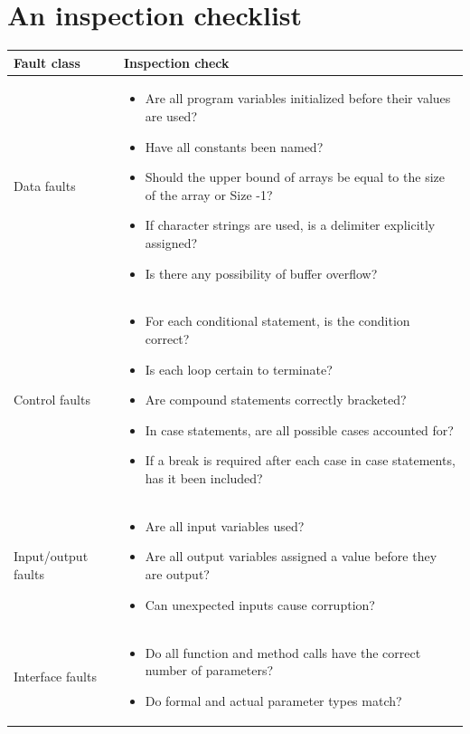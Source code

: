 \section {An inspection checklist}

\begin{longtable}{|p{2cm}|p{8cm}|}
\hline
Fault class & Inspection check\\
\hline
\hline
Data faults &
\begin{itemize}
  	\item Are all program variables initialized before their values are used?
    \item Have all constants been named?
  	\item Should the upper bound of arrays be equal to the size of the array or Size -1?
  	\item If character strings are used, is a delimiter explicitly assigned?
    \item Is there any possibility of buffer overflow?
\end{itemize}\\
\hline
Control faults &
\begin{itemize}
  	\item For each conditional statement, is the condition correct?
    \item Is each loop certain to terminate?
  	\item Are compound statements correctly bracketed?
  	\item In case statements, are all possible cases accounted for?
  	\item If a break is required after each case in case statements, has it been included?
\end{itemize}\\
\hline
Input/output faults &
\begin{itemize}
  	\item Are all input variables used?
  	\item Are all output variables assigned a value before they are output?
    \item Can unexpected inputs cause corruption?
\end{itemize}\\
\hline
Interface faults &
\begin{itemize}
  	\item Do all function and method calls have the correct number of parameters?
  	\item Do formal and actual parameter types match?

\end{itemize}
\end{longtable}
